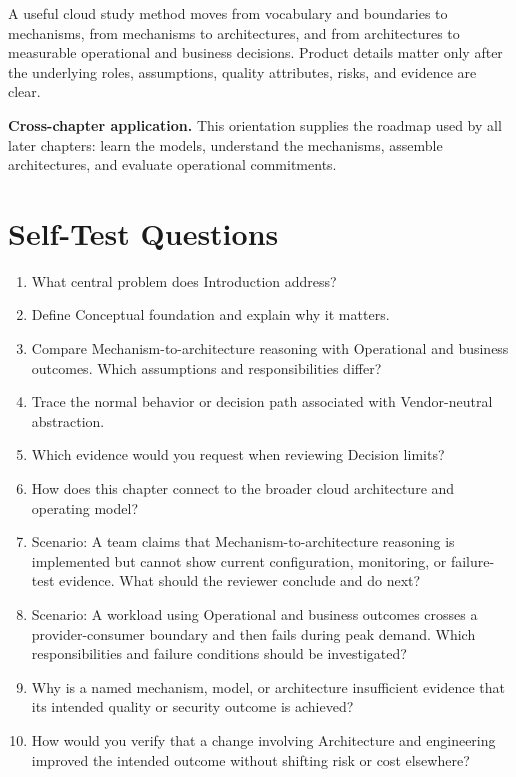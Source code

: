 \documentclass[11pt]{article}
\begin{document}
\begin{synthesisbox}
A useful cloud study method moves from vocabulary and boundaries to mechanisms, from mechanisms to architectures, and from architectures to measurable operational and business decisions. Product details matter only after the underlying roles, assumptions, quality attributes, risks, and evidence are clear.
\par\smallskip
\textbf{Cross-chapter application.} This orientation supplies the roadmap used by all later chapters: learn the models, understand the mechanisms, assemble architectures, and evaluate operational commitments.
\end{synthesisbox}
\section{Self-Test Questions}
\begin{enumerate}
\item What central problem does Introduction address?
\item Define Conceptual foundation and explain why it matters.
\item Compare Mechanism-to-architecture reasoning with Operational and business outcomes. Which assumptions and responsibilities differ?
\item Trace the normal behavior or decision path associated with Vendor-neutral abstraction.
\item Which evidence would you request when reviewing Decision limits?
\item How does this chapter connect to the broader cloud architecture and operating model?
\item Scenario: A team claims that Mechanism-to-architecture reasoning is implemented but cannot show current configuration, monitoring, or failure-test evidence. What should the reviewer conclude and do next?
\item Scenario: A workload using Operational and business outcomes crosses a provider-consumer boundary and then fails during peak demand. Which responsibilities and failure conditions should be investigated?
\item Why is a named mechanism, model, or architecture insufficient evidence that its intended quality or security outcome is achieved?
\item How would you verify that a change involving Architecture and engineering improved the intended outcome without shifting risk or cost elsewhere?
\end{enumerate}
\clearpage
\end{document}
